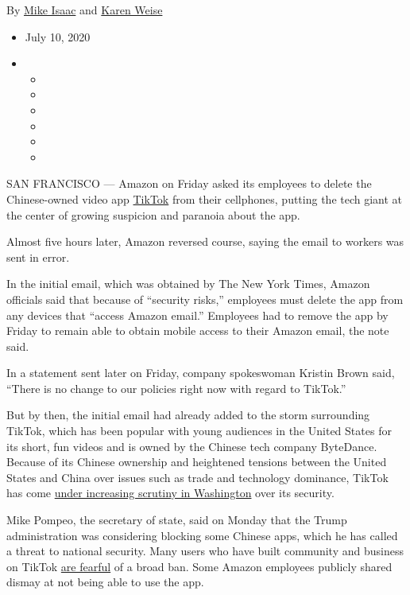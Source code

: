 By \href{https://www.nytimes.com/by/mike-isaac}{Mike Isaac} and
\href{https://www.nytimes.com/by/karen-weise}{Karen Weise}

\begin{itemize}
\item
  July 10, 2020
\item
  \begin{itemize}
  \item
  \item
  \item
  \item
  \item
  \item
  \end{itemize}
\end{itemize}

SAN FRANCISCO --- Amazon on Friday asked its employees to delete the
Chinese-owned video app
\href{https://www.nytimes.com/2020/08/03/technology/trump-tiktok-microsoft.html}{TikTok}
from their cellphones, putting the tech giant at the center of growing
suspicion and paranoia about the app.

Almost five hours later, Amazon reversed course, saying the email to
workers was sent in error.

In the initial email, which was obtained by The New York Times, Amazon
officials said that because of ``security risks,'' employees must delete
the app from any devices that ``access Amazon email.'' Employees had to
remove the app by Friday to remain able to obtain mobile access to their
Amazon email, the note said.

In a statement sent later on Friday, company spokeswoman Kristin Brown
said, ``There is no change to our policies right now with regard to
TikTok.''

But by then, the initial email had already added to the storm
surrounding TikTok, which has been popular with young audiences in the
United States for its short, fun videos and is owned by the Chinese tech
company ByteDance. Because of its Chinese ownership and heightened
tensions between the United States and China over issues such as trade
and technology dominance, TikTok has come
\href{https://www.nytimes.com/2019/11/01/technology/tiktok-national-security-review.html}{under
increasing scrutiny in Washington} over its security.

Mike Pompeo, the secretary of state, said on Monday that the Trump
administration was considering blocking some Chinese apps, which he has
called a threat to national security. Many users who have built
community and business on TikTok
\href{https://www.nytimes.com/2020/07/10/style/tiktok-ban-us-users-influencers.html}{are
fearful} of a broad ban. Some Amazon employees publicly shared dismay at
not being able to use the app.


